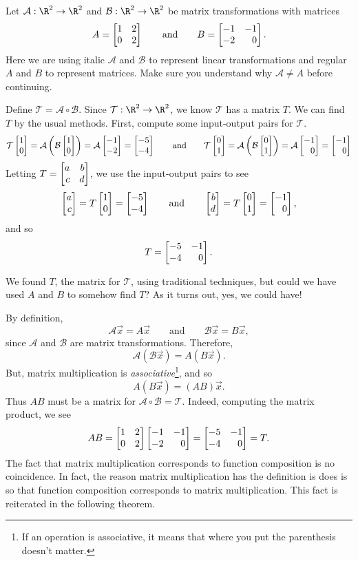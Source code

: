 Let $\mathcal A:\R^2\to\R^2$ and $\mathcal B:\R^2\to\R^2$ be matrix transformations with matrices
\[
	A=\mat{1&2\\0&2}\qquad\text{and}\qquad B=\mat{-1&-1\\-2&0}.
\]
Here we are using italic $\mathcal A$ and $\mathcal B$ to represent linear transformations and regular $A$ and $B$ to represent
matrices. Make sure you understand why $\mathcal A\neq A$ before continuing.


Define $\mathcal T=\mathcal A\circ \mathcal B$. Since $\mathcal T:\R^2\to\R^2$, we know $\mathcal T$ has a matrix $T$. We can
find $T$ by the usual methods. First, compute some input-output pairs for $\mathcal T$.
\[
	\mathcal T\mat{1\\0} = \mathcal A\left( \mathcal B\mat{1\\0}\right) = \mathcal A\mat{-1\\-2}=\mat{-5\\-4}
	\qquad\text{and}\qquad
	\mathcal T\mat{0\\1} = \mathcal A\left( \mathcal B\mat{0\\1}\right) = \mathcal A\mat{-1\\0}=\mat{-1\\0}
\]
Letting $T=\mat{a&b\\c&d}$, we use the input-output pairs to see
\[
	\mat{a\\c}=T\mat{1\\0}=\mat{-5\\-4}\qquad \text{and}\qquad \mat{b\\d}=T\mat{0\\1}=\mat{-1\\0},
\]
and so
\[
	T=\mat{-5&-1\\-4&0}.
\]

We found $T$, the matrix for $\mathcal T$, using traditional techniques, but could we have used $A$ and $B$ to somehow find $T$?
As it turns out, yes, we could have!

By definition,
\[
	\mathcal A\vec x=A\vec x\qquad\text{and}\qquad \mathcal B\vec x=B\vec x,
\]
since $\mathcal A$ and $\mathcal B$ are matrix transformations. Therefore,
\[
	\mathcal A(\mathcal B\vec x) = A(B\vec x).
\]
But, matrix multiplication is \emph{associative}\footnote{ If an operation is associative, it means
that where you put the parenthesis doesn't matter.}, and so
\[
	A(B\vec x)=(AB)\vec x.
\]
Thus $AB$ must be a matrix for $\mathcal A\circ \mathcal B=\mathcal T$. Indeed, computing the matrix product, we see
\[
	AB=\mat{1&2\\0&2}\mat{-1&-1\\-2&0}=\mat{-5&-1\\-4&0}=T.
\]
The fact that matrix multiplication corresponds to function composition is no coincidence. In fact, 
the reason matrix multiplication has the definition is does is so that function composition
corresponds to matrix multiplication. This fact is reiterated in the following theorem.

